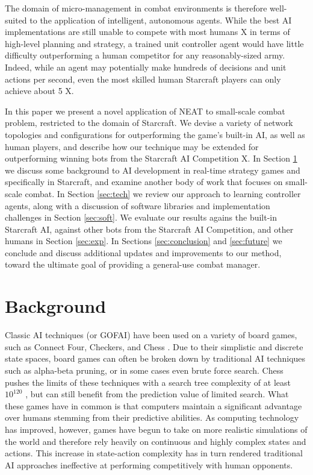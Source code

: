 \documentclass[a4paper]{article}
\newcommand{\fillin}[1]{X}
\begin{document}
The domain of micro-management in combat environments is therefore well-suited to the application of intelligent, autonomous agents. While the best AI implementations are still unable to compete with most humans \fillin{add citation to support this} in terms of high-level planning and strategy, a trained unit controller agent would have little difficulty outperforming a human competitor for any reasonably-sized army. Indeed, while an agent may potentially make hundreds of decisions and unit actions per second, even the most skilled human Starcraft players can only achieve about 5 \fillin{add citation for this}.

In this paper we present a novel application of NEAT to small-scale combat problem, restricted to the domain of Starcraft. We devise a variety of network topologies and configurations for outperforming the game's built-in AI, as well as human players, and describe how our technique may be extended for outperforming winning bots from the Starcraft AI Competition \fillin{ai competition citation}. In Section \ref{sec:back} we discuss some background to AI development in real-time strategy games and specifically in Starcraft, and examine another body of work that focuses on small-scale combat. In Section \ref{sec:tech} we review our approach to learning controller agents, along with a discussion of software libraries and implementation challenges in Section \ref{sec:soft}. We evaluate our results agains the built-in Starcraft AI, against other bots from the Starcraft AI Competition, and other humans in Section \ref{sec:exp}. In Sections \ref{sec:conclusion} and \ref{sec:future} we conclude and discuss additional updates and improvements to our method, toward the ultimate goal of providing a general-use combat manager.

\section{Background}
\label{sec:back}

Classic AI techniques (or GOFAI) have been used on a variety of board games, such as Connect Four, Checkers, and Chess \cite{Allis94searchingfor}. Due to their simplistic and discrete state spaces, board games can often be broken down by traditional AI techniques such as alpha-beta pruning, or in some cases even brute force search. Chess pushes the limits of these techniques with a search tree complexity of at least $10^{120}$ \cite{Shannon:1988:PCP:61701.67002}, but can still benefit from the prediction value of limited search. What these games have in common is that computers maintain a significant advantage over humans stemming from their predictive abilities. As computing technology has improved, however, games have begun to take on more realistic simulations of the world and therefore rely heavily on continuous and highly complex states and actions. This increase in state-action complexity has in turn rendered traditional AI approaches ineffective at performing competitively with human opponents.
\end{document}
